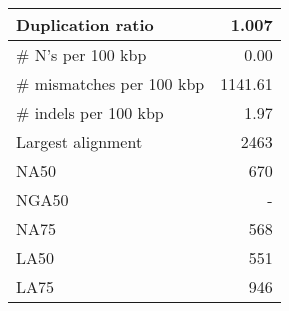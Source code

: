 \documentclass[12pt,a4paper]{article}
\begin{document}
\begin{table}[ht]
\begin{center}
\begin{tabular}{|l*{1}{|r}|}
Duplication ratio & 1.007 \\ \hline
\# N's per 100 kbp & 0.00 \\ \hline
\# mismatches per 100 kbp & 1141.61 \\ \hline
\# indels per 100 kbp & 1.97 \\ \hline
Largest alignment & 2463 \\ \hline
NA50 & 670 \\ \hline
NGA50 & - \\ \hline
NA75 & 568 \\ \hline
LA50 & 551 \\ \hline
LA75 & 946 \\ \hline
\end{tabular}
\end{center}
\end{table}
\end{document}
